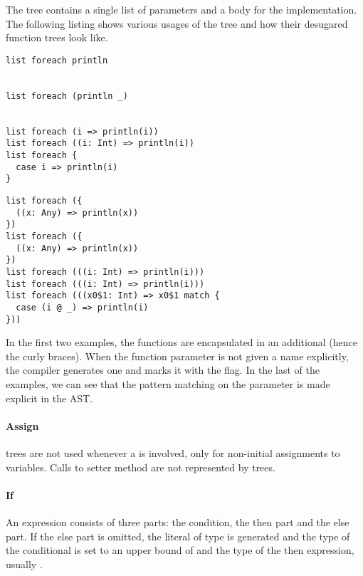 \noindent The  tree contains a single list of parameters and a body for the implementation. The following listing shows various usages of the  tree and how their desugared function trees look like.

\begin{multicols}{2}
\begin{lstlisting}
list foreach println


list foreach (println _)


list foreach (i => println(i))
list foreach ((i: Int) => println(i))
list foreach {
  case i => println(i)
}
\end{lstlisting}
\begin{lstlisting}
list foreach ({
  ((x: Any) => println(x))
})
list foreach ({
  ((x: Any) => println(x))
})
list foreach (((i: Int) => println(i)))
list foreach (((i: Int) => println(i)))
list foreach (((x0$1: Int) => x0$1 match {
  case (i @ _) => println(i)
}))
\end{lstlisting}
\end{multicols}

In the first two examples, the functions are encapsulated in an additional  (hence the curly braces). When the function parameter is not given a name explicitly, the compiler generates one and marks it with the  flag. In the last of the examples, we can see that the pattern matching on the parameter is made explicit in the AST.

\paragraph{Assign} 

\noindent {} trees are not used whenever a \src{=} is involved, only for non-initial assignments to variables. Calls to setter method are not represented by  trees.

\paragraph{If} 

\noindent An  expression consists of three parts: the condition, the then part and the else part. If the else part is omitted, the literal \src{()} of type  is generated and the type of the conditional is set to an upper bound of  and the type of the then expression, usually .

